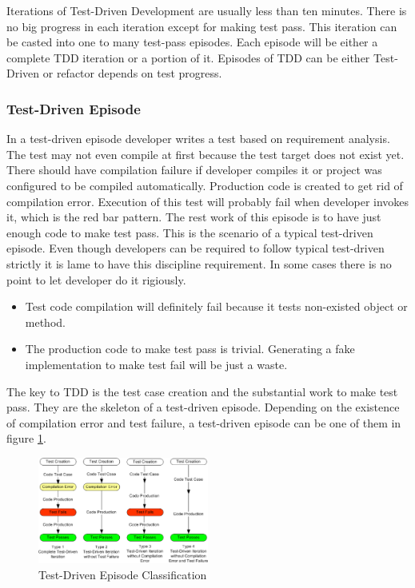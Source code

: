 \documentclass[11pt,twocolumn]{article}
\begin{document}
Iterations of Test-Driven Development are usually less than ten minutes.
There is no big progress in each iteration except for making test pass.
This iteration can be casted into one to many test-pass episodes. Each
episode will be either a complete TDD iteration or a portion of it.
Episodes of TDD can be either Test-Driven or refactor depends on test
progress.

\subsubsection{Test-Driven Episode}
In a test-driven episode developer writes a test based on requirement
analysis. The test may not even compile at first because the test target
does not exist yet. There should have compilation failure if developer
compiles it or project was configured to be compiled automatically.
Production code is created to get rid of compilation error.  Execution of
this test will probably fail when developer invokes it, which is the red
bar pattern. The rest work of this episode is to have just enough code to
make test pass. This is the scenario of a typical test-driven episode. Even
though developers can be required to follow typical test-driven strictly it
is lame to have this discipline requirement. In some cases there is no
point to let developer do it rigiously.
\begin{itemize}
\item Test code compilation will definitely fail because it tests
  non-existed object or method.
\item The production code to make test pass is trivial. Generating a fake
  implementation to make test fail will be just a waste.
\end{itemize}

The key to TDD is the test case creation and the substantial work to make
test pass. They are the skeleton of a test-driven episode. Depending on the
existence of compilation error and test failure, a test-driven episode can
be one of them in figure \ref{fig:TDD}.

\begin{figure}[ht] 
  \centering
  \includegraphics[width=0.5\textwidth]{picture/TDD.eps}
  \caption{Test-Driven Episode Classification}\label{fig:TDD}
\end{figure} 
\end{document}
